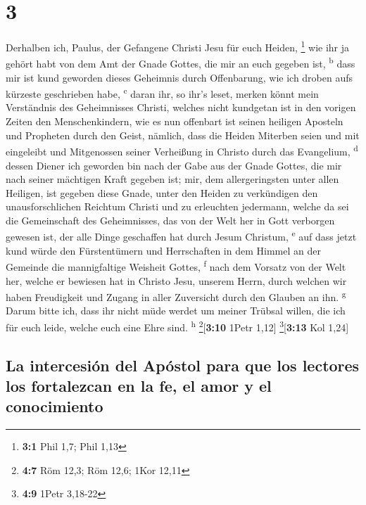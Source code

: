 \hypertarget{section-2}{%
\section{3}\label{section-2}}

 Derhalben ich, Paulus, der Gefangene Christi Jesu für
euch Heiden, \footnote{\textbf{3:1} Phil 1,7; Phil 1,13} 
wie ihr ja gehört habt von dem Amt der Gnade Gottes, die mir an euch
gegeben ist, \textsuperscript{b}  dass mir ist kund
geworden dieses Geheimnis durch Offenbarung, wie ich droben aufs
kürzeste geschrieben habe, \textsuperscript{c}  daran ihr,
so ihr's leset, merken könnt mein Verständnis des Geheimnisses Christi,
 welches nicht kundgetan ist in den vorigen Zeiten den
Menschenkindern, wie es nun offenbart ist seinen heiligen Aposteln und
Propheten durch den Geist,  nämlich, dass die Heiden
Miterben seien und mit eingeleibt und Mitgenossen seiner Verheißung in
Christo durch das Evangelium, \textsuperscript{d}  dessen
Diener ich geworden bin nach der Gabe aus der Gnade Gottes, die mir nach
seiner mächtigen Kraft gegeben ist;  mir, dem
allergeringsten unter allen Heiligen, ist gegeben diese Gnade, unter den
Heiden zu verkündigen den unausforschlichen Reichtum Christi
 und zu erleuchten jedermann, welche da sei die
Gemeinschaft des Geheimnisses, das von der Welt her in Gott verborgen
gewesen ist, der alle Dinge geschaffen hat durch Jesum Christum,
\textsuperscript{e}  auf dass jetzt kund würde den
Fürstentümern und Herrschaften in dem Himmel an der Gemeinde die
mannigfaltige Weisheit Gottes, \textsuperscript{f}  nach
dem Vorsatz von der Welt her, welche er bewiesen hat in Christo Jesu,
unserem Herrn,  durch welchen wir haben Freudigkeit und
Zugang in aller Zuversicht durch den Glauben an ihn. \textsuperscript{g}
 Darum bitte ich, dass ihr nicht müde werdet um meiner
Trübsal willen, die ich für euch leide, welche euch eine Ehre sind.
\textsuperscript{h} \footnote{\textbf{4:7} Röm 12,3; Röm 12,6; 1Kor
  12,11}{[}\textbf{3:10} 1Petr 1,12{]} \footnote{\textbf{4:9} 1Petr
  3,18-22}{[}\textbf{3:13} Kol 1,24{]}

\hypertarget{la-intercesiuxf3n-del-apuxf3stol-para-que-los-lectores-los-fortalezcan-en-la-fe-el-amor-y-el-conocimiento}{%
\subsection{La intercesión del Apóstol para que los lectores los
fortalezcan en la fe, el amor y el
conocimiento}\label{la-intercesiuxf3n-del-apuxf3stol-para-que-los-lectores-los-fortalezcan-en-la-fe-el-amor-y-el-conocimiento}}

